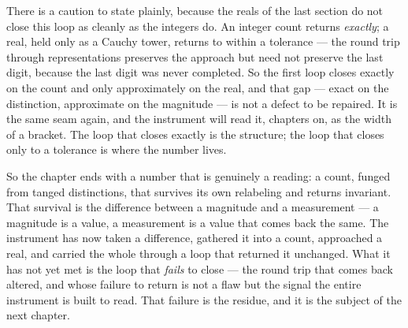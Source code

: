 There is a caution to state plainly, because the reals of the last section do not close this loop as cleanly as the integers
do. An integer count returns \emph{exactly}; a real, held only as a Cauchy tower, returns to within a tolerance --- the round
trip through representations preserves the approach but need not preserve the last digit, because the last digit was never
completed. So the first loop closes exactly on the count and only approximately on the real, and that gap --- exact on the
distinction, approximate on the magnitude --- is not a defect to be repaired. It is the same seam again, and the instrument
will read it, chapters on, as the width of a bracket. The loop that closes exactly is the structure; the loop that closes
only to a tolerance is where the number lives.

So the chapter ends with a number that is genuinely a reading: a count, funged from tanged distinctions, that survives its
own relabeling and returns invariant. That survival is the difference between a magnitude and a measurement --- a magnitude
is a value, a measurement is a value that comes back the same. The instrument has now taken a difference, gathered it into a
count, approached a real, and carried the whole through a loop that returned it unchanged. What it has not yet met is the
loop that \emph{fails} to close --- the round trip that comes back altered, and whose failure to return is not a flaw but the
signal the entire instrument is built to read. That failure is the residue, and it is the subject of the next chapter.
